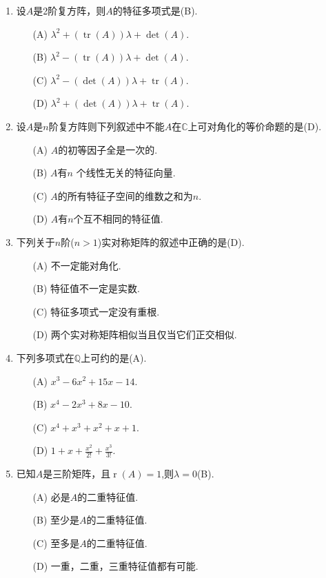 \begin{enumerate}
    \item 设$A$是2阶复方阵，则$A$的特征多项式是(B).
    \begin{enumerate}
        \item[(A)] $\lambda^2+(\operatorname{tr}(A))\lambda+\operatorname{det}(A)$.
        \item[(B)] $\lambda^2-(\operatorname{tr}(A))\lambda+\operatorname{det}(A)$.
        \item[(C)] $\lambda^2-(\operatorname{det}(A))\lambda+\operatorname{tr}(A)$.
        \item[(D)] $\lambda^2+(\operatorname{det}(A))\lambda+\operatorname{tr}(A)$.
    \end{enumerate}
    \item 设$A$是$n$阶复方阵则下列叙述中不能$A$在$\mathbb{C}$上可对角化的等价命题的是(D).
    \begin{enumerate}
        \item[(A)] $A$的初等因子全是一次的.
        \item[(B)] $A$有$n$ 个线性无关的特征向量.
        \item[(C)] $A$的所有特征子空间的维数之和为$n$.
        \item[(D)] $A$有$n$个互不相同的特征值.
    \end{enumerate}
    \item 下列关于$n$阶($n>1$)实对称矩阵的叙述中正确的是(D).
    \begin{enumerate}
        \item[(A)] 不一定能对角化.
        \item[(B)] 特征值不一定是实数.
        \item[(C)] 特征多项式一定没有重根.
        \item[(D)] 两个实对称矩阵相似当且仅当它们正交相似.
    \end{enumerate}
    \item 下列多项式在$\mathbb{Q}$上可约的是(A).
    \begin{enumerate}
        \item[(A)] $x^3-6x^2+15x-14$.
        \item[(B)] $x^4-2x^3+8x-10$.
        \item[(C)] $x^4+x^3+x^2+x+1$.
        \item[(D)] $1+x+\frac{x^2}{2!}+\frac{x^3}{3!}$.
    \end{enumerate}
    \item 已知$A$是三阶矩阵，且$\operatorname{r}(A)=1$,则$\lambda=0$(B).
    \begin{enumerate}
        \item[(A)] 必是$A$的二重特征值.
        \item[(B)] 至少是$A$的二重特征值.
        \item[(C)] 至多是$A$的二重特征值.
        \item[(D)] 一重，二重，三重特征值都有可能.
    \end{enumerate}
\end{enumerate}

